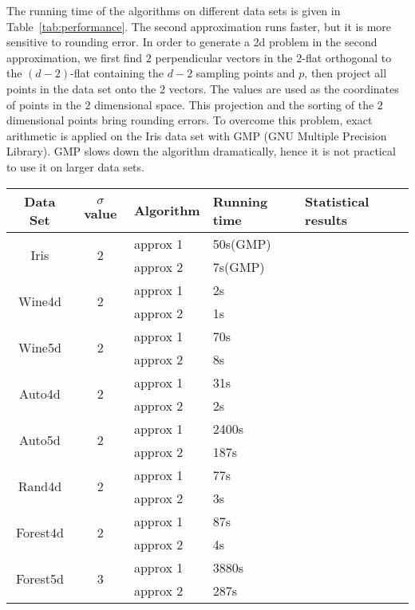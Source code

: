 \documentclass{patmorin}
\begin{document}
The running time of the algorithms on different data sets is given in Table~\ref{tab:performance}. The second approximation runs faster, but it is more sensitive to rounding error. In order to generate a 2d problem in the second approximation, we first find $2$ perpendicular vectors in the $2$-flat orthogonal to the $(d-2)$-flat containing the $d-2$ sampling points and $p$, then project all points in the data set onto the $2$ vectors. The values are used as the coordinates of points in the $2$ dimensional space. This projection and the sorting of the $2$ dimensional points bring rounding errors. To overcome this problem, exact arithmetic is applied on the Iris data set with GMP (GNU Multiple Precision Library). GMP slows down the algorithm dramatically, hence it is not practical to use it on larger data sets.
\begin{table}[!htb]
  \centering
  \begin{tabular}[center]{|c|c|l|l|l|}
    \hline
    Data Set & $\sigma$ value & Algorithm & Running time & Statistical results \\
    \hline
    \multirow{2}{*}{Iris} & \multirow{2}{*}{2} & approx 1  & 50s(GMP) & \\
    & & approx 2 & 7s(GMP) & \\
    \hline
    \multirow{2}{*}{Wine4d} & \multirow{2}{*}{2} & approx 1 & 2s & \\
    & & approx 2 & 1s & \\
    \hline
    \multirow{2}{*}{Wine5d} & \multirow{2}{*}{2} & approx 1 & 70s & \\
    & & approx 2 & 8s & \\
    \hline
    \multirow{2}{*}{Auto4d} & \multirow{2}{*}{2} & approx 1 & 31s & \\
    & & approx 2 & 2s & \\
    \hline
    \multirow{2}{*}{Auto5d} & \multirow{2}{*}{2} & approx 1 & 2400s & \\
    & & approx 2 & 187s & \\
    \hline
    \multirow{2}{*}{Rand4d} & \multirow{2}{*}{2} & approx 1 & 77s & \\
    & & approx 2 & 3s & \\
    \hline
    \multirow{2}{*}{Forest4d} & \multirow{2}{*}{2} & approx 1 & 87s & \\
    & & approx 2 & 4s & \\
    \hline
    \multirow{2}{*}{Forest5d} & \multirow{2}{*}{3} & approx 1 & 3880s & \\
    & & approx 2 & 287s & \\

\end{tabular}
\end{table}
\end{document}

